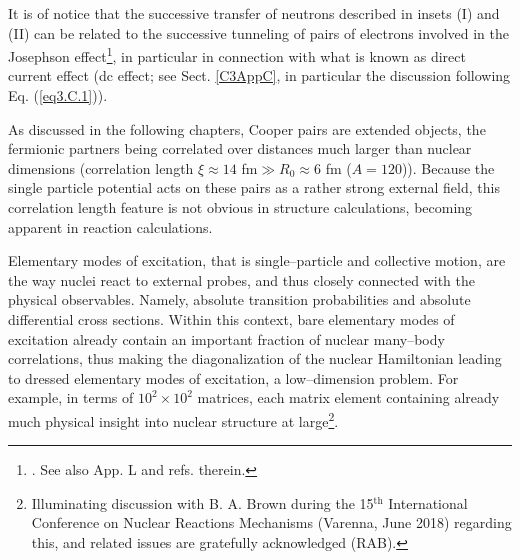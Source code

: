  It is of notice that the successive transfer of neutrons described in insets (I) and (II) can be related to the successive tunneling of pairs of electrons involved in the Josephson effect\footnote{ \cite{Josephson:62,Anderson:64b}. See also \cite{Brink:05} App. L and refs. therein.}, in particular in connection with what is known as direct current effect (dc effect; see Sect. \ref{C3AppC}, in particular the discussion following Eq. (\ref{eq3.C.1})). 


As discussed in the following chapters, Cooper pairs are extended objects, the fermionic partners being correlated over distances much larger than nuclear dimensions (correlation length $\xi\approx14$ fm$\gg R_0\approx 6$ fm ($A=120$)). Because the single particle potential acts on these pairs as a rather strong external field, this correlation length feature is not obvious in structure calculations, becoming apparent in reaction calculations. 


Elementary modes of excitation, that is single--particle  and collective motion, are the way nuclei react to external probes, and thus closely connected with the  physical observables. Namely, absolute transition probabilities and absolute differential cross sections. Within this context, bare elementary modes of excitation already contain an important fraction of nuclear many--body correlations,  thus making the diagonalization of the nuclear Hamiltonian leading to dressed elementary modes of excitation, a low--dimension problem. For example, in terms of  $10^2\times10^2$ matrices, each matrix element containing already much  physical insight into nuclear structure at large\footnote{Illuminating discussion with B. A. Brown during the 15$^{\text{th}}$ International Conference on Nuclear Reactions Mechanisms (Varenna, June 2018) regarding this, and related issues are gratefully acknowledged (RAB).}. 



